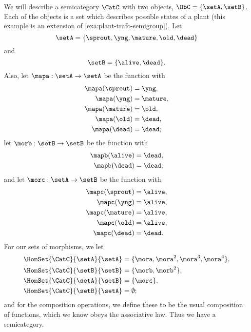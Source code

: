 \begin{example}
	\label{exa:semicat-plant-states}
	We will describe a semicategory $\CatC$ with two objects, $\ObC = \{ \setA, \setB \}$.
	Each of the objects is a set which describes possible states of a plant (this example is an extension of \cref{exa:plant-trafo-semigroup}).
	Let
	\begin{equation}
		\setA = \{ \sprout, \yng, \mature, \old, \dead \}
	\end{equation}
	and
	\begin{equation}
		\setB = \{ \alive, \dead \}.
	\end{equation}
	Also, let $\mapa : \setA \to \setA$ be the function with
	\begin{align*}
		\mapa(\sprout) & =  \yng,    \\
		\mapa(\yng)    & =  \mature, \\
		\mapa(\mature) & =  \old,    \\
		\mapa( \old)   & = \dead,    \\
		\mapa (\dead)  & = \dead;
	\end{align*}
	let $\morb : \setB \to \setB$ be the function with
	\begin{align*}
		\mapb(\alive) & =  \dead, \\
		\mapb(\dead)  & =  \dead;
	\end{align*}
	and let $\morc : \setA \to \setB$ be the function with
	\begin{align*}
		\mapc(\sprout) & = \alive,  \\
		\mapc(\yng)    & =  \alive, \\
		\mapc(\mature) & = \alive , \\
		\mapc( \old)   & = \alive,  \\
		\mapc (\dead)  & = \dead.
	\end{align*}
	For our sets of morphisms, we let
	\begin{align*}
		\HomSet{\CatC}{\setA}{\setA} & = \{ \mora, \mora^2, \mora^3, \mora^4 \}, \\
		\HomSet{\CatC}{\setB}{\setB} & =  \{ \morb, \morb^2 \},                  \\
		\HomSet{\CatC}{\setA}{\setB} & =  \{ \morc \},                           \\
		\HomSet{\CatC}{\setB}{\setA} & = \emptyset;
	\end{align*}
	and for the composition operations, we define these to be the usual composition of functions, which we know obeys the associative law.
	Thus we have a semicategory.
\end{example}

